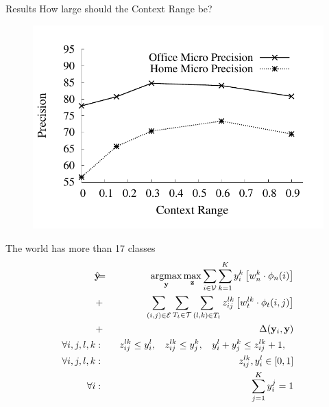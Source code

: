 \documentclass{beamer}
\DeclareMathOperator*{\argmax}{argmax}
\newcommand{\y}{{\mathbf y}}     %
\newcommand{\ysc}[2]{{y_{#1}^{#2}}}    %
\newcommand{\zsc}[2]{{z_{#1}^{#2}}}    %
\newcommand{\fn}[1]{{\phi_n(#1)}}      %
\newcommand{\fe}[3]{{\phi_{#1}(#2,#3)}}%
\newcommand{\wn}[1]{{w_n^{#1}}}        %
\newcommand{\we}[3]{{w_{#1}^{#2#3}}}   %
\newcommand{\loss}[2]{{\Delta(#1,#2)}}   %
\begin{document}
\begin{frame}{Results}
How large should the Context Range be?
  \begin{figure}
	\includegraphics[scale=0.5]{radiusEffectPlot.pdf} 
  \end{figure}
\end{frame}


\begin{frame}{The world has more than 17 classes}
 \begin{eqnarray*}
\hat{\y}\!\!\!&=&\!\!\!\argmax_{\y}\max_{\mathbf z} \sum_{i \in \mathcal{V}} \sum_{k=1}^{K} \ysc{i}{k} \left[\wn{k} \cdot \fn{i} \right] \\
&+&  \!\!\!\sum_{(i,j)\in \mathcal{E}}  \sum_{T_t \in {\cal T}} \sum_{(l,k)\in T_t} \zsc{ij}{lk} \left[\we{t}{l}{k} \cdot \fe{t}{i}{j}\right] \\
&+& \loss{\y_i}{\y} \label{eq:relaxobj}\\
\forall i,j,l,k &:& \:\: \zsc{ij}{lk}\le \ysc{i}{l}, \:\:\:\:
\zsc{ij}{lk}\le \ysc{j}{k},\:\:\:\:
\ysc{i}{l} + \ysc{j}{k} \le \zsc{ij}{lk}+1,\:\:\:\: \\
\forall i,j,l,k &:& \zsc{ij}{lk},\ysc{i}{l} \in [ 0,1 ] \label{eq:relaxconst}\\
\forall i &:& \sum_{j=1}^{K} y_i^j = 1
\end{eqnarray*} 

\end{frame}
\end{document}
